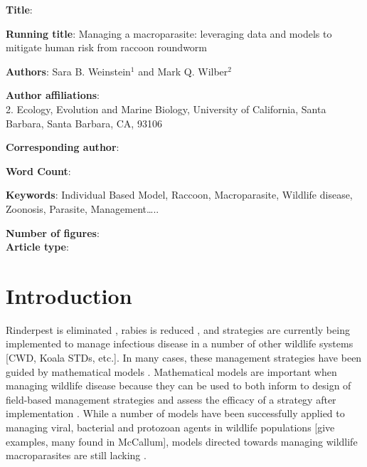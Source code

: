 \documentclass[11pt]{article}
\begin{document}
\noindent
\textbf{Title}{}: 

\bigskip

\noindent
\textbf{Running title}: Managing a macroparasite: leveraging data and models to mitigate human risk from raccoon roundworm

\bigskip

\noindent
\textbf{Authors}:  Sara B. Weinstein$^1$ and Mark Q. Wilber$^2$

\bigskip

\noindent
\textbf{Author affiliations}: \\
2. Ecology, Evolution and Marine Biology, University of California, Santa Barbara, Santa Barbara, CA, 93106 \\

\bigskip

\noindent
\textbf{Corresponding author}:

\bigskip

\noindent
\textbf{Word Count}: 

\bigskip

\noindent
\textbf{Keywords}: Individual Based Model, Raccoon, Macroparasite,
Wildlife disease, Zoonosis, Parasite, Management\ldots{}..

\bigskip

\noindent
\textbf{Number of figures}:  \\
\textbf{Article type}: 

\clearpage

\section{Introduction}

Rinderpest is eliminated \citep{Roeder2011}, rabies is reduced \citep{Freuling2013}, and strategies are currently being implemented to manage infectious disease in a number of other wildlife systems [CWD, Koala STDs, etc.]. In many cases, these management strategies have been
guided by mathematical models \citep[e.g.][]{Restif2012,McCallum2017}.  Mathematical models are important when managing wildlife disease because they can be used to both inform to design of field-based management strategies and assess the efficacy of a strategy after implementation  \citep{Restif2012}.  While a number of models have been successfully applied to managing
viral, bacterial and protozoan agents in wildlife populations [give examples, many found in McCallum], models directed
towards managing wildlife macroparasites are still lacking \citep[][, but see X X X for macroparasite models in livestock]{McCallum2017}.
\end{document}
